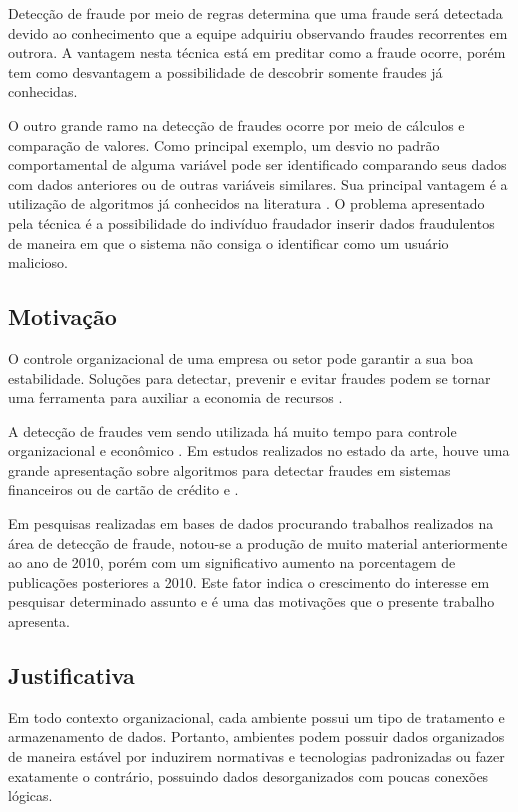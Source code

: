 \documentclass[smallextended]{svjour3}       %
\begin{document}
Detecção de fraude por meio de regras determina que uma fraude será detectada devido ao conhecimento que a equipe adquiriu observando fraudes recorrentes em outrora. A vantagem nesta técnica está em preditar como a fraude ocorre, porém tem como desvantagem a possibilidade de descobrir somente fraudes já conhecidas.

O outro grande ramo na detecção de fraudes ocorre por meio de cálculos e comparação de valores. Como principal exemplo, um desvio no padrão comportamental de alguma variável pode ser identificado comparando seus dados com dados anteriores ou de outras variáveis similares. Sua principal vantagem é a utilização de algoritmos já conhecidos na literatura \citep{Fawcett1997}. O problema apresentado pela técnica é a possibilidade do indivíduo fraudador inserir dados fraudulentos de maneira em que o sistema não consiga o identificar como um usuário malicioso.

\subsection{Motivação}
O controle organizacional de uma empresa ou setor pode garantir a sua boa estabilidade. Soluções para detectar, prevenir e evitar fraudes podem se tornar uma ferramenta para auxiliar a economia de recursos \citep{809570}. 

A detecção de fraudes vem sendo utilizada há muito tempo para controle organizacional e econômico \citep{Seyedhossein2010}. Em estudos realizados no estado da arte, houve uma grande apresentação sobre algoritmos para detectar fraudes em sistemas financeiros ou de cartão de crédito \citep{Chandola:2009:ADS:1541880.1541882} e \citep{Abdallah201690}.

Em pesquisas realizadas em bases de dados procurando trabalhos realizados na área de detecção de fraude, notou-se a produção de muito material anteriormente ao ano de 2010, porém com um significativo aumento na porcentagem de publicações posteriores a 2010. Este fator indica o crescimento do interesse em pesquisar determinado assunto e é uma das motivações que o presente trabalho apresenta.

\subsection{Justificativa}
Em todo contexto organizacional, cada ambiente possui um tipo de tratamento e armazenamento de dados. Portanto, ambientes podem possuir dados organizados de maneira estável por induzirem normativas e tecnologias padronizadas ou fazer exatamente o contrário, possuindo dados desorganizados com poucas conexões lógicas.
\end{document}
